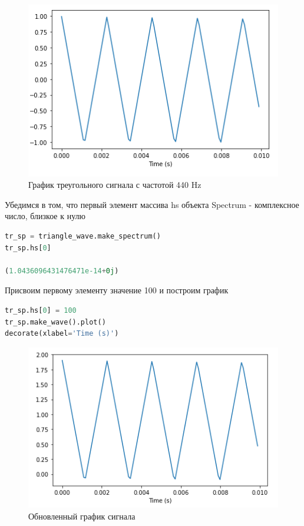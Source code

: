 \begin{figure}[H]
	\begin{center}
		\includegraphics[scale=1]{fig/lab02/lab02_08.png}
		\caption{График треугольного сигнала с частотой 440 Hz}
	\end{center}
\end{figure}

Убедимся в том, что первый элемент массива hs объекта Spectrum - комплексное число, близкое к нулю

\begin{lstlisting}[language=Python]
tr_sp = triangle_wave.make_spectrum()
tr_sp.hs[0]

(1.0436096431476471e-14+0j)
\end{lstlisting}

Присвоим первому элементу значение 100 и построим график

\begin{lstlisting}[language=Python]
tr_sp.hs[0] = 100
tr_sp.make_wave().plot()
decorate(xlabel='Time (s)')
\end{lstlisting}

\begin{figure}[H]
	\begin{center}
		\includegraphics[scale=1]{fig/lab02/lab02_09.png}
		\caption{Обновленный график сигнала}
	\end{center}
\end{figure}

